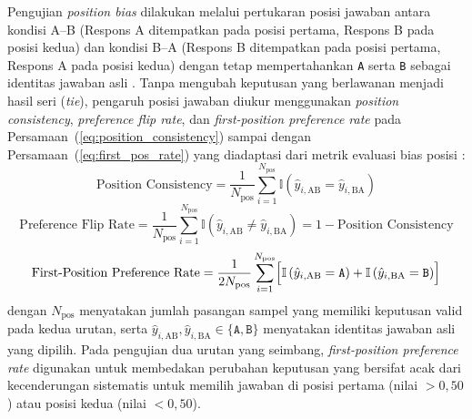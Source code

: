 Pengujian \textit{position bias} dilakukan melalui pertukaran posisi jawaban antara kondisi A--B (Respons A ditempatkan pada posisi pertama, Respons B pada posisi kedua) dan kondisi B--A (Respons B ditempatkan pada posisi pertama, Respons A pada posisi kedua) dengan tetap mempertahankan \texttt{A} serta \texttt{B} sebagai identitas jawaban asli \cite{zhengJudgingLLMasaJudgeMTBench2023}\cite{shiJudgingJudgesSystematic}\cite{anghelDiagnosingBiasInstability2025}. Tanpa mengubah keputusan yang berlawanan menjadi hasil seri (\textit{tie}), pengaruh posisi jawaban diukur menggunakan \textit{position consistency}, \textit{preference flip rate}, dan \textit{first-position preference rate} pada Persamaan~(\ref{eq:position_consistency}) sampai dengan Persamaan~(\ref{eq:first_pos_rate}) yang diadaptasi dari metrik evaluasi bias posisi \cite{shiJudgingJudgesSystematic}\cite{normanReliabilityValiditySystematic2026}\cite{yagubyanCoinFlipJudge2026}:
\begin{equation}
  \text{Position Consistency} = \frac{1}{N_{\text{pos}}} \sum_{i=1}^{N_{\text{pos}}} \mathbb{I}\left(\hat{y}_{i,\text{AB}} = \hat{y}_{i,\text{BA}}\right)
  \label{eq:position_consistency}
\end{equation}
\begin{equation}
  \text{Preference Flip Rate} = \frac{1}{N_{\text{pos}}} \sum_{i=1}^{N_{\text{pos}}} \mathbb{I}\left(\hat{y}_{i,\text{AB}} \neq \hat{y}_{i,\text{BA}}\right) = 1 - \text{Position Consistency}
  \label{eq:preference_flip_rate}
\end{equation}
\begin{equation}
  \text{First-Position Preference Rate} = \frac{1}{2N_{\text{pos}}} \sum_{i=1}^{N_{\text{pos}}} \Bigl[\mathbb{I}\left(\hat{y}_{i,\text{AB}} = \texttt{A}\right) + \mathbb{I}\left(\hat{y}_{i,\text{BA}} = \texttt{B}\right)\Bigr]
  \label{eq:first_pos_rate}
\end{equation}
dengan $N_{\text{pos}}$ menyatakan jumlah pasangan sampel yang memiliki keputusan valid pada kedua urutan, serta $\hat{y}_{i,\text{AB}}, \hat{y}_{i,\text{BA}} \in \{\texttt{A}, \texttt{B}\}$ menyatakan identitas jawaban asli yang dipilih. Pada pengujian dua urutan yang seimbang, \textit{first-position preference rate} digunakan untuk membedakan perubahan keputusan yang bersifat acak dari kecenderungan sistematis untuk memilih jawaban di posisi pertama (nilai $>0,50$) atau posisi kedua (nilai $<0,50$).

